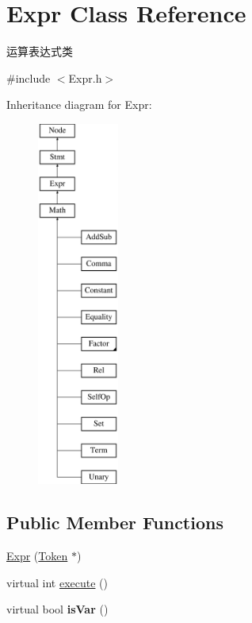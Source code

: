 \hypertarget{class_expr}{}\section{Expr Class Reference}
\label{class_expr}


运算表达式类  




{\ttfamily \#include $<$Expr.\+h$>$}

Inheritance diagram for Expr\+:\begin{figure}[H]
\begin{center}
\leavevmode
\includegraphics[height=12.000000cm]{class_expr}
\end{center}
\end{figure}
\subsection*{Public Member Functions}
\begin{DoxyCompactItemize}
\item 
\hyperlink{class_expr_a5a045d68e601c2e782e1958d55a07400}{Expr} (\hyperlink{class_token}{Token} $\ast$)
\item 
virtual int \hyperlink{class_expr_aff6a2e6eaa460e2a3db28ebdab089b51}{execute} ()
\item 
\mbox{\label{class_expr_add2b30644dd850c4bfa2d619d20d8c09}} 
virtual bool {\bfseries is\+Var} ()
\end{DoxyCompactItemize}
